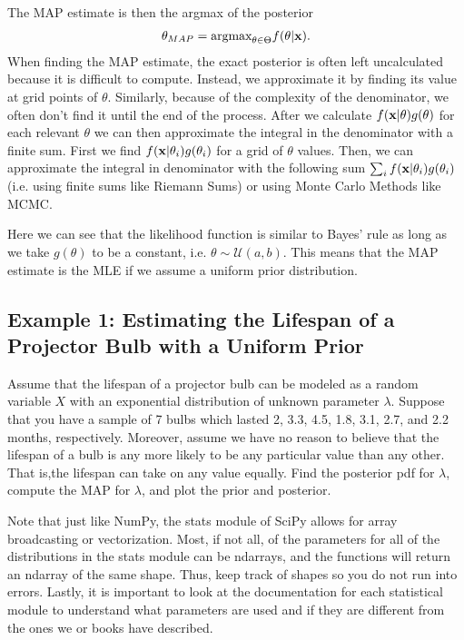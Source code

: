 The MAP estimate is then the argmax of the posterior
\begin{align}\label{eq:map}
  \theta_{MAP} = \mbox{argmax}_{\theta\in\Theta} f(\theta| \mathbf{x}).
\end{align}
When finding the MAP estimate, the exact posterior is often left uncalculated because it is difficult to compute.
Instead, we approximate it by finding its value at grid points of $\theta$.
Similarly, because of the complexity of the denominator, we often don't find it until the end of the process.
After we calculate $f(\mathbf{x} | \theta)g(\theta)$ for each relevant $\theta$ we can then approximate the integral in the denominator with a finite sum.
First we find $f(\mathbf{x} | \theta_i)g(\theta_i)$ for a grid of $\theta$ values.
Then, we can approximate the integral in denominator with the following sum $\sum_i f(\mathbf{x} | \theta_i)g(\theta_i)$ (i.e. using finite sums like Riemann Sums) or using Monte Carlo Methods like MCMC.

Here we can see that the likelihood function is similar to Bayes' rule as long as we take $g(\theta)$ to be a constant, i.e. $\theta\sim \mathcal{U}(a,b)$.
This means that the MAP estimate is the MLE if we assume a uniform prior distribution.

\subsection*{Example 1: Estimating the Lifespan of a Projector Bulb with a Uniform Prior}
Assume that the lifespan of a projector bulb can be modeled as a random variable $X$ with an exponential distribution of unknown parameter $\lambda$.
Suppose that you have a sample of 7 bulbs which lasted
2, 3.3, 4.5, 1.8, 3.1, 2.7, and 2.2 months, respectively. Moreover, assume we have no reason to believe that the lifespan of a bulb is any more likely to be any particular value than any other.
That is,the lifespan can take on any value equally.
Find the posterior pdf for $\lambda$, compute the MAP for $\lambda$, and plot the prior and posterior.

\begin{warn}
    Note that just like NumPy, the stats module of SciPy allows for array broadcasting or vectorization.
    Most, if not all, of the parameters for all of the distributions in the stats module can be ndarrays, and the functions will return an ndarray of the same shape.
    Thus, keep track of shapes so you do not run into errors.
    Lastly, it is important to look at the documentation for each statistical module to understand what parameters are used and if they are different from the ones we or books have described.
\end{warn}

